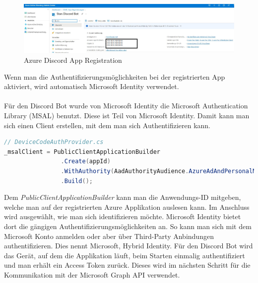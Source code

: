 \documentclass[a4paper, table]{article}
\begin{document}
\begin{figure}[h]
    \centering
    \includegraphics[width=1\textwidth]{img/azure_discord_app_blacked.png}
    \caption{Azure Discord App Registration}
    \label{fig:azure-discord-app-registration}
\end{figure}

Wenn man die Authentifizierungsmöglichkeiten bei der registrierten App aktiviert, wird automatisch Microsoft Identity verwendet.\\\\
Für den Discord Bot wurde von Microsoft Identity die Microsoft Authentication Library (MSAL) benutzt. \autocite{}
Diese ist Teil von Microsoft Identity.
Damit kann man sich einen Client erstellen, mit dem man sich Authentifizieren kann.

\begin{lstlisting}[language=csharp]
// DeviceCodeAuthProvider.cs
_msalClient = PublicClientApplicationBuilder
                .Create(appId)
                .WithAuthority(AadAuthorityAudience.AzureAdAndPersonalMicrosoftAccount, true)
                .Build();
\end{lstlisting}

Dem \textit{PublicClientApplicationBuilder} kann man die Anwendungs-ID mitgeben, welche man auf der registrierten Azure Applikation auslesen kann.
Im Anschluss wird ausgewählt, wie man sich identifizieren möchte.
Microsoft Identity bietet dort die gängigen Authentifizierungsmöglichkeiten an.
So kann man sich mit dem Microsoft Konto anmelden oder aber über Third-Party Anbindungen authentifizieren.
Dies nennt Microsoft, Hybrid Identity. \autocite{}
Für den Discord Bot wird das Gerät, auf dem die Applikation läuft, beim Starten einmalig authentifiziert und man erhält ein Access Token zurück.
Dieses wird im nächsten Schritt für die Kommunikation mit der Microsoft Graph API verwendet.
\end{document}
